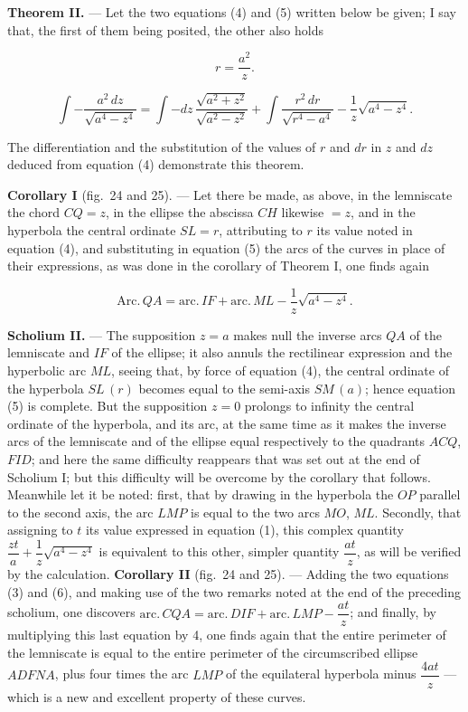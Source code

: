 \documentclass{article}
\begin{document}
\textbf{Theorem II.} --- Let the two equations (4) and (5) written below be given; I say that,
the first of them being posited, the other also holds

\[ r = \frac{a^{2}}{z}. \tag{4} \]

\[ \int -\frac{a^{2}\,dz}{\sqrt{a^{4} - z^{4}}} = \int -dz\, \frac{\sqrt{a^{2} + z^{2}}}{\sqrt{a^{2} - z^{2}}} + \int \frac{r^{2}\,dr}{\sqrt{r^{4} - a^{4}}} - \frac{1}{z}\sqrt{a^{4} - z^{4}}. \tag{5} \]

The differentiation and the substitution of the values of $r$ and $dr$ in $z$ and $dz$ deduced
from equation (4) demonstrate this theorem.

\textbf{Corollary I} (fig.~24 and 25). --- Let there be made, as above, in the lemniscate the
chord $CQ = z$, in the ellipse the abscissa $CH$ likewise $= z$, and in the hyperbola the
central ordinate $SL = r$, attributing to $r$ its value noted in equation (4), and substituting
in equation (5) the arcs of the curves in place of their expressions, as was done in the
corollary of Theorem I, one finds again

\[ \mathrm{Arc.}\,QA = \mathrm{arc.}\,IF + \mathrm{arc.}\,ML - \frac{1}{z}\sqrt{a^{4} - z^{4}}. \tag{6} \]

\textbf{Scholium II.} --- The supposition $z = a$ makes null the inverse arcs $QA$ of the
lemniscate and $IF$ of the ellipse; it also annuls the rectilinear expression and the
hyperbolic arc $ML$, seeing that, by force of equation (4), the central ordinate of the
hyperbola $SL\,(r)$ becomes equal to the semi-axis $SM\,(a)$; hence equation (5) is complete.
But the supposition $z = 0$ prolongs to infinity the central ordinate of the hyperbola, and its
arc, at the same time as it makes the inverse arcs of the lemniscate and of the ellipse equal
respectively to the quadrants $ACQ$, $FID$; and here the same difficulty reappears that was set
out at the end of Scholium I; but this difficulty will be overcome by the corollary that
follows. Meanwhile let it be noted: first, that by drawing in the hyperbola the $OP$ parallel to
the second axis, the arc $LMP$ is equal to the two arcs $MO$, $ML$. Secondly, that assigning to
$t$ its value expressed in equation (1), this complex quantity
$\dfrac{zt}{a} + \dfrac{1}{z}\sqrt{a^{4} - z^{4}}$ is equivalent to this other, simpler quantity
$\dfrac{at}{z}$, as will be verified by the calculation.
\textbf{Corollary II} (fig.~24 and 25). --- Adding the two equations (3) and (6), and making use
of the two remarks noted at the end of the preceding scholium, one discovers
$\mathrm{arc.}\,CQA = \mathrm{arc.}\,DIF + \mathrm{arc.}\,LMP - \dfrac{at}{z}$; and finally, by
multiplying this last equation by 4, one finds again that the entire perimeter of the lemniscate
is equal to the entire perimeter of the circumscribed ellipse $ADFNA$, plus four times the arc
$LMP$ of the equilateral hyperbola minus $\dfrac{4at}{z}$ --- which is a new and excellent
property of these curves.
\end{document}
